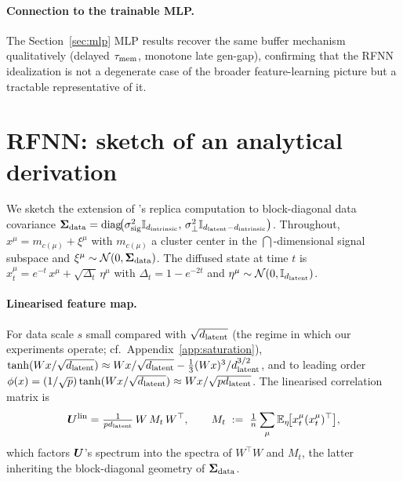 \paragraph{Connection to the trainable MLP.}
The Section~\ref{sec:mlp} MLP results recover the same buffer
mechanism qualitatively (delayed $\tau_{\mathrm{mem}}$, monotone late
gen-gap), confirming that the RFNN idealization is not a degenerate
case of the broader feature-learning picture but a tractable
representative of it.

\section{RFNN: sketch of an analytical derivation}
\label{app:proof-sketch}

We sketch the extension of \citeauthor{bonnaire2025}'s replica
computation to block-diagonal data covariance
$\bm{\Sigma}_{\mathrm{data}} = \operatorname{diag}\!\bigl(\sigma_{\mathrm{sig}}^2\mathbb{I}_{d_{\mathrm{intrinsic}}},\,
\sigma_{\perp}^2\mathbb{I}_{d_{\mathrm{latent}} - d_{\mathrm{intrinsic}}}\bigr)$. Throughout,
$x^\mu = m_{c(\mu)} + \xi^\mu$ with $m_{c(\mu)}$ a cluster center in
the $\dint$-dimensional signal subspace and $\xi^\mu \sim
\mathcal{N}(0, \bm{\Sigma}_{\mathrm{data}})$. The diffused state at time $t$ is
$x_t^\mu = e^{-t}\,x^\mu + \sqrt{\Delta_t}\,\eta^\mu$ with
$\Delta_t = 1 - e^{-2t}$ and $\eta^\mu \sim \mathcal{N}(0, \mathbb{I}_{d_{\mathrm{latent}}})$.

\paragraph{Linearised feature map.}
For data scale $s$ small compared with $\sqrt{d_{\mathrm{latent}}}$ (the regime in
which our experiments operate; cf.~Appendix~\ref{app:saturation}),
$\tanh(Wx/\sqrt{d_{\mathrm{latent}}}) \approx Wx/\sqrt{d_{\mathrm{latent}}} - \tfrac{1}{3}(Wx)^3/d_{\mathrm{latent}}^{3/2}$,
and to leading order $\phi(x) = (1/\sqrt{p})\tanh(Wx/\sqrt{d_{\mathrm{latent}}})
\approx Wx/\sqrt{pd_{\mathrm{latent}}}$. The linearised correlation matrix is
\begin{equation}
  \bm{U}^{\mathrm{lin}} = \tfrac{1}{pd_{\mathrm{latent}}}\,W\,M_t\,W^\top,
  \qquad
  M_t \;:=\; \tfrac{1}{n}\sum_{\mu} \mathbb{E}_{\eta}\!\bigl[x_t^\mu (x_t^\mu)^\top\bigr],
  \label{eq:U-lin}
\end{equation}
which factors $\bm{U}$'s spectrum into the spectra of $W^\top W$ and
$M_t$, the latter inheriting the block-diagonal geometry of
$\bm{\Sigma}_{\mathrm{data}}$.

